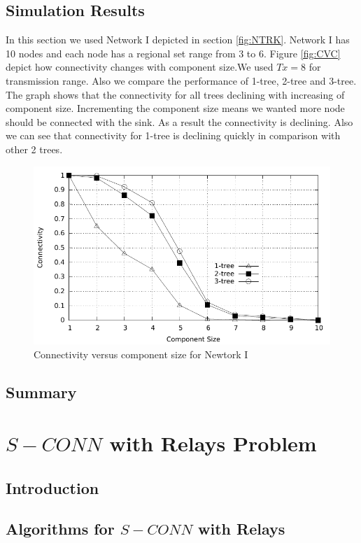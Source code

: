 \documentclass[12pt]{article}
\begin{document}
\subsection{Simulation Results}
In this section we used Network I depicted in section \ref{fig:NTRK}. Network I has 10 nodes and each node has a regional set range from 3 to 6. Figure \ref{fig:CVC} depict how connectivity changes with component size.We used $Tx=8$ for transmission range. Also we compare the performance of 1-tree, 2-tree and 3-tree. The graph shows that the connectivity for all trees declining with increasing of component size. Incrementing the component size means we wanted more node should be connected with the sink. As a result the connectivity is declining.  Also we can see that connectivity for 1-tree is declining quickly in comparison with other 2 trees.
\begin{figure}
\begin{minipage}{.9\linewidth}
\includegraphics[width=6 in, height=2.8 in]{ConVsCom_woR.pdf}
\caption{Connectivity versus component size for Newtork I }
\label{Fig:CVC}
\end{minipage}
\end{figure}
\subsection{Summary}

\section{ $S-CONN$ with Relays Problem}
\subsection{Introduction}
\subsection{Algorithms for $S-CONN$ with Relays}
\end{document}
